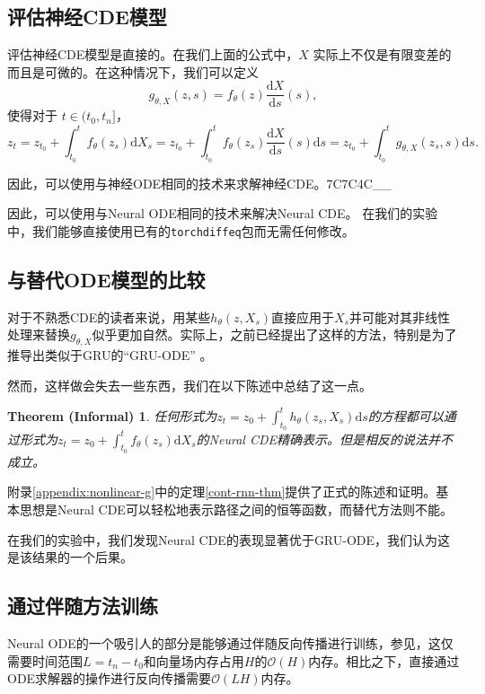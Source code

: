 \documentclass{ctexart}
\theoremstyle{plain}
\newtheorem*{thm-informal}{Theorem (Informal)}
\theoremstyle{definition}
\newcommand{\bigO}{\mathcal{O}}
\begin{document}
	\subsection{评估神经CDE模型}\label{subsection:evaluate}
	评估神经CDE模型是直接的。在我们上面的公式中，$X$ 实际上不仅是有限变差的而且是可微的。在这种情况下，我们可以定义
\begin{equation}\label{eq:g-theta-x}
	g_{\theta, X}(z, s) = f_\theta(z) \frac{\mathrm{d}X}{\mathrm{d}s}(s),
\end{equation}
	使得对于 $t \in (t_0, t_n]$，
\begin{equation}\label{eq:ncde-to-node}
	z_t = z_{t_0} + \int_{t_0}^t f_\theta(z_s) \mathrm{d} X_s = z_{t_0} + \int_{t_0}^t f_\theta(z_s) \frac{\mathrm{d}X}{\mathrm{d}s}(s) \mathrm{d}s = z_{t_0} + \int_{t_0}^t g_{\theta, X}(z_s, s) \mathrm{d}s.
\end{equation}
	
	因此，可以使用与神经ODE相同的技术来求解神经CDE。7C7C4C\_\_

	因此，可以使用与Neural ODE相同的技术来解决Neural CDE。%
	在我们的实验中，我们能够直接使用已有的\texttt{torchdiffeq}包\cite{torchdiffeq}而无需任何修改。

	\subsection{与替代ODE模型的比较}\label{section:contrnn}
	对于不熟悉CDE的读者来说，用某些$h_\theta(z, X_s)$直接应用于$X_s$并可能对其非线性处理来替换$g_{\theta, X}$似乎更加自然。实际上，之前已经提出了这样的方法，特别是为了推导出类似于GRU的“GRU-ODE” \cite{gru-ode-bayes, gruode}。

	然而，这样做会失去一些东西，我们在以下陈述中总结了这一点。
\begin{thm-informal}
	任何形式为$z_t = z_0 + \int_{t_0}^t h_\theta(z_s, X_s) \mathrm{d}s$的方程都可以通过形式为$z_t = z_0 + \int_{t_0}^t f_\theta(z_s) \mathrm{d}X_s$的Neural CDE精确表示。但是相反的说法并不成立。
\end{thm-informal}

	附录\ref{appendix:nonlinear-g}中的定理\ref{cont-rnn-thm}提供了正式的陈述和证明。基本思想是Neural CDE可以轻松地表示路径之间的恒等函数，而替代方法则不能。

	在我们的实验中，我们发现Neural CDE的表现显著优于GRU-ODE，我们认为这是该结果的一个后果。

	\subsection{通过伴随方法训练}\label{subsection:train}
	Neural ODE的一个吸引人的部分是能够通过伴随反向传播进行训练，参见\cite{neural-odes, pontryagin, Giles2000, Hager2000}，这仅需要时间范围$L = t_n-t_0$和向量场内存占用$H$的$\bigO(H)$内存。相比之下，直接通过ODE求解器的操作进行反向传播需要$\bigO(LH)$内存。
\end{document}
